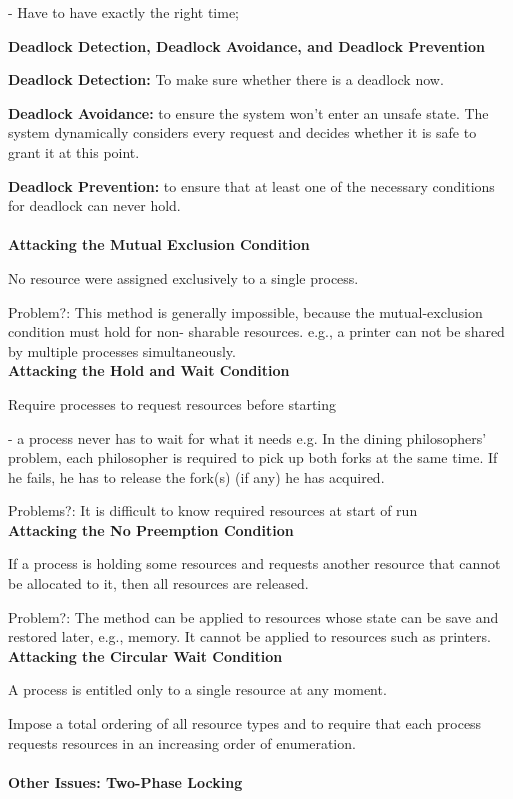 \documentclass[]{report}
\begin{document}
- Have to have exactly the right time;

\textbf{Deadlock Detection, Deadlock
	Avoidance, and Deadlock Prevention}

\textbf{Deadlock Detection:} To make sure whether there is a
deadlock now.

\textbf{Deadlock Avoidance:} to ensure the system won’t
enter an unsafe state. The system dynamically
considers every request and decides whether it is safe
to grant it at this point.

\textbf{Deadlock Prevention:} to ensure that at least one of
the necessary conditions for deadlock can never hold.\\\\
\textbf{Attacking the Mutual Exclusion Condition}

No resource were assigned exclusively to a
single process.

Problem?:
This method is generally impossible, because the
mutual-exclusion condition must hold for non-
sharable resources. e.g., a printer can not be shared
by multiple processes simultaneously.
\\
\textbf{Attacking the Hold and Wait Condition}

Require processes to request resources before
starting

- a process never has to wait for what it needs
e.g. In the dining philosophers’ problem, each
philosopher is required to pick up both forks at the
same time. If he fails, he has to release the fork(s) (if
any) he has acquired.

Problems?: 
It is difficult to know required resources at start of run
\\
\textbf{Attacking the No Preemption Condition}

If a process is holding some resources and requests
another resource that cannot be allocated to it, then
all resources are released.

Problem?:
The method can be applied to resources whose state can
be save and restored later, e.g., memory.
It cannot be applied to resources such as printers.
\\
\textbf{Attacking the Circular Wait Condition}

A process is entitled only to a single resource at
any moment.

Impose a total ordering of all resource types and
to require that each process requests resources in
an increasing order of enumeration.
\\\\
\textbf{Other Issues: Two-Phase Locking}
\end{document}
